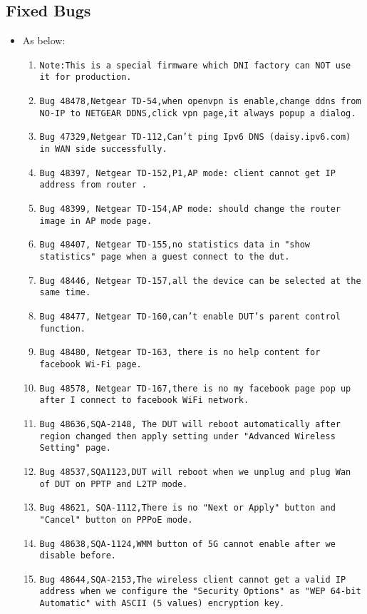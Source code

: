 \documentclass[12pt]{report}
\begin{document}
    \subsection{Fixed Bugs}
    \begin{itemize}
    \item As below:
    	\begin{enumerate}
		\item \texttt{Note:This is a special firmware which DNI factory can NOT use it for production.}
		\item \texttt{Bug 48478,Netgear TD-54,when openvpn is enable,change ddns from NO-IP to NETGEAR DDNS,click vpn page,it always popup a dialog.}
		\item \texttt{Bug 47329,Netgear TD-112,Can't ping Ipv6 DNS (daisy.ipv6.com) in WAN side successfully.}
		\item \texttt{Bug 48397, Netgear TD-152,P1,AP mode: client cannot get IP address from router .}
		\item \texttt{Bug 48399, Netgear TD-154,AP mode: should change the router image in AP mode page.}
		\item \texttt{Bug 48407, Netgear TD-155,no statistics data in "show statistics" page when a guest connect to the dut.}
		\item \texttt{Bug 48446, Netgear TD-157,all the device can be selected at the same time. }
		\item \texttt{Bug 48477, Netgear TD-160,can't enable DUT's parent control function.}
		\item \texttt{Bug 48480, Netgear TD-163, there is no help content for facebook Wi-Fi page.}
		\item \texttt{Bug 48578, Netgear TD-167,there is no my facebook page pop up after I connect to facebook WiFi network.}
		\item \texttt{Bug 48636,SQA-2148, The DUT will reboot automatically after region changed then apply setting under "Advanced Wireless Setting" page.}
		\item \texttt{Bug 48537,SQA1123,DUT will reboot when we unplug and plug Wan of DUT on PPTP and L2TP mode.}
		\item \texttt{Bug 48621, SQA-1112,There is no "Next or Apply" button and "Cancel" button on PPPoE mode.}
		\item \texttt{Bug 48638,SQA-1124,WMM button of 5G cannot enable after we disable before.}
		\item \texttt{Bug 48644,SQA-2153,The wireless client cannot get a valid IP address when we configure the "Security Options" as "WEP 64-bit Automatic" with ASCII (5 values) encryption key.}

\end{enumerate}
\end{itemize}
\end{document}

